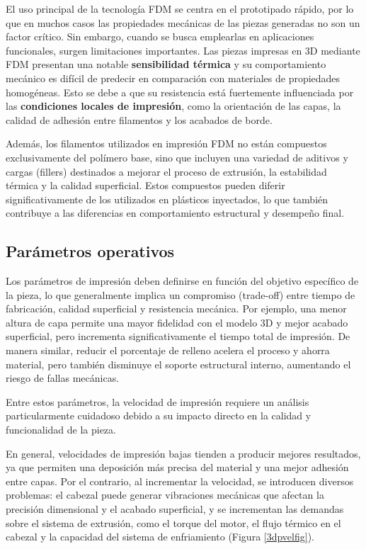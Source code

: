 El uso principal de la tecnología FDM se centra en el prototipado rápido, por lo que en muchos casos las propiedades mecánicas de las piezas generadas no son un factor crítico. Sin embargo, cuando se busca emplearlas en aplicaciones funcionales, surgen limitaciones importantes. Las piezas impresas en 3D mediante FDM presentan una notable \textbf{sensibilidad térmica} y su comportamiento mecánico es difícil de predecir en comparación con materiales de propiedades homogéneas. Esto se debe a que su resistencia está fuertemente influenciada por las \textbf{condiciones locales de impresión}, como la orientación de las capas, la calidad de adhesión entre filamentos y los acabados de borde. 

Además, los filamentos utilizados en impresión FDM no están compuestos exclusivamente del polímero base, sino que incluyen una variedad de aditivos y cargas (fillers) destinados a mejorar el proceso de extrusión, la estabilidad térmica y la calidad superficial. Estos compuestos pueden diferir significativamente de los utilizados en plásticos inyectados, lo que también contribuye a las diferencias en comportamiento estructural y desempeño final.

\subsection{Parámetros operativos}

Los parámetros de impresión deben definirse en función del objetivo específico de la pieza, lo que generalmente implica un compromiso (trade-off) entre tiempo de fabricación, calidad superficial y resistencia mecánica. Por ejemplo, una menor altura de capa permite una mayor fidelidad con el modelo 3D y mejor acabado superficial, pero incrementa significativamente el tiempo total de impresión. De manera similar, reducir el porcentaje de relleno acelera el proceso y ahorra material, pero también disminuye el soporte estructural interno, aumentando el riesgo de fallas mecánicas.

Entre estos parámetros, la velocidad de impresión requiere un análisis particularmente cuidadoso debido a su impacto directo en la calidad y funcionalidad de la pieza.

En general, velocidades de impresión bajas tienden a producir mejores resultados, ya que permiten una deposición más precisa del material y una mejor adhesión entre capas. Por el contrario, al incrementar la velocidad, se introducen diversos problemas: el cabezal puede generar vibraciones mecánicas que afectan la precisión dimensional y el acabado superficial, y se incrementan las demandas sobre el sistema de extrusión, como el torque del motor, el flujo térmico en el cabezal y la capacidad del sistema de enfriamiento (Figura \ref{3dpvelfig}).

